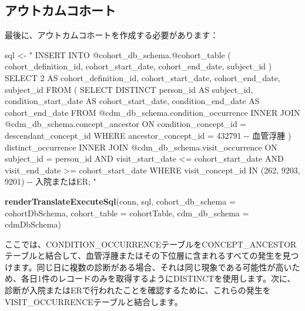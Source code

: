 \documentclass[
  11pt]{book}
\newenvironment{Shaded}{\begin{snugshade}}{\end{snugshade}}
\newcommand{\AttributeTok}[1]{\textcolor[rgb]{0.13,0.29,0.53}{#1}}
\newcommand{\FunctionTok}[1]{\textcolor[rgb]{0.13,0.29,0.53}{\textbf{#1}}}
\newcommand{\NormalTok}[1]{#1}
\newcommand{\OtherTok}[1]{\textcolor[rgb]{0.56,0.35,0.01}{#1}}
\newcommand{\StringTok}[1]{\textcolor[rgb]{0.31,0.60,0.02}{#1}}
\theoremstyle{definition}
\theoremstyle{definition}
\theoremstyle{definition}
\theoremstyle{definition}
\theoremstyle{remark}
\begin{document}
\subsection{アウトカムコホート}\label{ux30a2ux30a6ux30c8ux30abux30e0ux30b3ux30dbux30fcux30c8}

最後に、アウトカムコホートを作成する必要があります：

\begin{Shaded}
\begin{Highlighting}[]
\NormalTok{sql }\OtherTok{\textless{}{-}} \StringTok{"}
\StringTok{INSERT INTO @cohort\_db\_schema.@cohort\_table (}
\StringTok{ cohort\_definition\_id,}
\StringTok{ cohort\_start\_date,}
\StringTok{ cohort\_end\_date,}
\StringTok{subject\_id}
\StringTok{)}
\StringTok{SELECT 2 AS cohort\_definition\_id,}
\StringTok{  cohort\_start\_date,}
\StringTok{  cohort\_end\_date,}
\StringTok{  subject\_id}
\StringTok{FROM (}
\StringTok{  SELECT DISTINCT person\_id AS subject\_id,}
\StringTok{    condition\_start\_date AS cohort\_start\_date,}
\StringTok{    condition\_end\_date AS cohort\_end\_date}
\StringTok{  FROM @cdm\_db\_schema.condition\_occurrence}
\StringTok{  INNER JOIN @cdm\_db\_schema.concept\_ancestor}
\StringTok{    ON condition\_concept\_id = descendant\_concept\_id}
\StringTok{  WHERE ancestor\_concept\_id = 432791 {-}{-} 血管浮腫}
\StringTok{) distinct\_occurrence}
\StringTok{INNER JOIN @cdm\_db\_schema.visit\_occurrence}
\StringTok{  ON subject\_id = person\_id}
\StringTok{  AND visit\_start\_date \textless{}= cohort\_start\_date}
\StringTok{  AND visit\_end\_date \textgreater{}= cohort\_start\_date}
\StringTok{WHERE visit\_concept\_id IN (262, 9203,}
\StringTok{    9201) {-}{-} 入院またはER;}
\StringTok{"}

\FunctionTok{renderTranslateExecuteSql}\NormalTok{(conn, sql,}
                          \AttributeTok{cohort\_db\_schema =}\NormalTok{ cohortDbSchema,}
                          \AttributeTok{cohort\_table =}\NormalTok{ cohortTable,}
                          \AttributeTok{cdm\_db\_schema =}\NormalTok{ cdmDbSchema)}
\end{Highlighting}
\end{Shaded}

ここでは、CONDITION\_OCCURRENCEテーブルをCONCEPT\_ANCESTORテーブルと結合して、血管浮腫またはその下位層に含まれるすべての発生を見つけます。同じ日に複数の診断がある場合、それは同じ現象である可能性が高いため、各日1件のレコードのみを取得するようにDISTINCTを使用します。次に、診断が入院またはERで行われたことを確認するために、これらの発生をVISIT\_OCCURRENCEテーブルと結合します。
\end{document}
